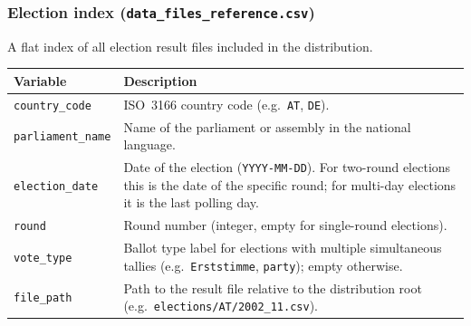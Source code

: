 \subsubsection{Election index (\texttt{data\_files\_reference.csv})}
\label{sec:variables_reference}

A flat index of all election result files included in the distribution.

\begin{longtable}{p{3.5cm}p{11.5cm}}
\toprule
\textbf{Variable} & \textbf{Description} \\
\midrule
\endhead
\texttt{country\_code}    & ISO~3166 country code (e.g.\ \texttt{AT},
                            \texttt{DE}). \\
\texttt{parliament\_name} & Name of the parliament or assembly in the
                            national language. \\
\texttt{election\_date}   & Date of the election (\texttt{YYYY-MM-DD}).
                            For two-round elections this is the date of the
                            specific round; for multi-day elections it is
                            the last polling day. \\
\texttt{round}            & Round number (integer, empty for single-round
                            elections). \\
\texttt{vote\_type}       & Ballot type label for elections with multiple
                            simultaneous tallies (e.g.\ \texttt{Erststimme},
                            \texttt{party}); empty otherwise. \\
\texttt{file\_path}       & Path to the result file relative to the
                            distribution root (e.g.\
                            \texttt{elections/AT/2002\_11.csv}). \\
\bottomrule
\end{longtable}
